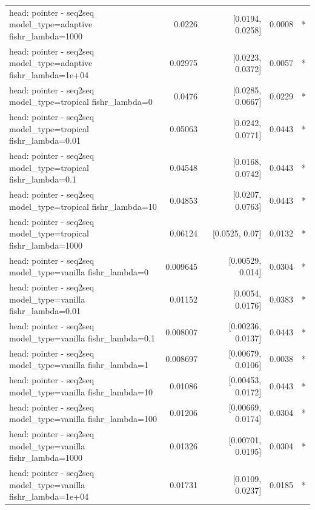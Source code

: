 \documentclass[10pt]{article}
\makeatletter
\newcommand{\stackcell}[1]{\begin{tabular}[t]{@{}l@{}}#1\end{tabular}}
\makeatother
\begin{document}
{\begin{longtable}{lrrrl}
\stackcell{head: pointer - seq2seq\\\footnotesize model\_type=adaptive fishr\_lambda=1000 } & 0.0226 & [0.0194, 0.0258] & 0.0008 & *\\
\stackcell{head: pointer - seq2seq\\\footnotesize model\_type=adaptive fishr\_lambda=1e+04 } & 0.02975 & [0.0223, 0.0372] & 0.0057 & *\\
\stackcell{head: pointer - seq2seq\\\footnotesize model\_type=tropical fishr\_lambda=0 } & 0.0476 & [0.0285, 0.0667] & 0.0229 & *\\
\stackcell{head: pointer - seq2seq\\\footnotesize model\_type=tropical fishr\_lambda=0.01 } & 0.05063 & [0.0242, 0.0771] & 0.0443 & *\\
\stackcell{head: pointer - seq2seq\\\footnotesize model\_type=tropical fishr\_lambda=0.1 } & 0.04548 & [0.0168, 0.0742] & 0.0443 & *\\
\stackcell{head: pointer - seq2seq\\\footnotesize model\_type=tropical fishr\_lambda=10 } & 0.04853 & [0.0207, 0.0763] & 0.0443 & *\\
\stackcell{head: pointer - seq2seq\\\footnotesize model\_type=tropical fishr\_lambda=1000 } & 0.06124 & [0.0525, 0.07] & 0.0132 & *\\
\stackcell{head: pointer - seq2seq\\\footnotesize model\_type=vanilla fishr\_lambda=0 } & 0.009645 & [0.00529, 0.014] & 0.0304 & *\\
\stackcell{head: pointer - seq2seq\\\footnotesize model\_type=vanilla fishr\_lambda=0.01 } & 0.01152 & [0.0054, 0.0176] & 0.0383 & *\\
\stackcell{head: pointer - seq2seq\\\footnotesize model\_type=vanilla fishr\_lambda=0.1 } & 0.008007 & [0.00236, 0.0137] & 0.0443 & *\\
\stackcell{head: pointer - seq2seq\\\footnotesize model\_type=vanilla fishr\_lambda=1 } & 0.008697 & [0.00679, 0.0106] & 0.0038 & *\\
\stackcell{head: pointer - seq2seq\\\footnotesize model\_type=vanilla fishr\_lambda=10 } & 0.01086 & [0.00453, 0.0172] & 0.0443 & *\\
\stackcell{head: pointer - seq2seq\\\footnotesize model\_type=vanilla fishr\_lambda=100 } & 0.01206 & [0.00669, 0.0174] & 0.0304 & *\\
\stackcell{head: pointer - seq2seq\\\footnotesize model\_type=vanilla fishr\_lambda=1000 } & 0.01326 & [0.00701, 0.0195] & 0.0304 & *\\
\stackcell{head: pointer - seq2seq\\\footnotesize model\_type=vanilla fishr\_lambda=1e+04 } & 0.01731 & [0.0109, 0.0237] & 0.0185 & *\\
\bottomrule
\end{longtable}
}
\end{document}
